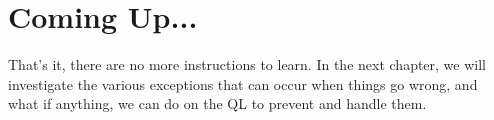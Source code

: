 \section{Coming Up...}
\label{ch5-the-end}%

That's it, there are no more instructions to learn. In the next
    chapter, we will investigate the various exceptions that can occur when
    things go wrong, and what if anything, we can do on the QL to prevent and
    handle them.

